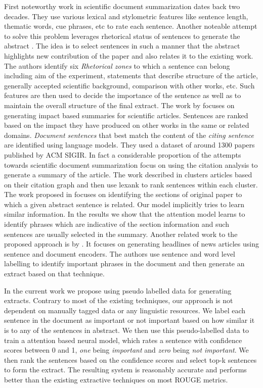 First noteworthy work in scientific document summarization dates back two decades\cite{kupiec1995trainable}. They use various lexical and stylometric features like sentence length, thematic words, cue phrases, etc to rate each sentence. Another noteable attempt to solve this problem leverages rhetorical status of sentences to generate the abstract \cite{teufel2002summarizing}. The idea is to select sentences in such a manner that the abstract highlights new contribution of the paper and also relates it to the existing work. The authors identify	six \emph{Rhetorical zones} to which a sentence can belong including aim of the experiment, statements that describe structure of the article, generally accepted scientific background, comparison with other works, etc. Such features are then used to decide the importance of the sentence as well as to maintain the overall structure of the final extract. The work by \cite{mei2008generating} focuses on generating impact based summaries for scientific articles. Sentences are ranked based on the impact they have produced on other works in the same or related domains. \emph{Document sentences} that best match the content of the \emph{citing sentence} are identified using language models. They used a dataset of around 1300 papers published by ACM SIGIR. In fact a considerable proportion of the attempts towards scientific document summarization focus on using the citation analysis to generate a summary of the article. The work described in \cite{abu2011coherent} clusters articles based on their citation graph and then use lexank to rank sentences within each cluster. The work proposed in \cite{hirohata2008identifying} focuses on identifying the sections of original paper to which a given abstract sentence is related. Our model implicitly tries to learn similar information. In the results we show that the attention model learns to identify phrases which are indicative of the section information and such sentences are usually selected in the summary. Another related work to the proposed approach is by \cite{cheng2016neural}. It focuses on generating headlines of news articles using sentence and document encoders. The authors use sentence and word level labelling to identify important phrases in the document and then generate an extract based on that technique. 

In the current work we propose using pseudo labelled data for generating extracts. Contrary to most of the existing techniques, our approach is not dependent on manually tagged data or any linguistic resources. We label each sentence in the document as important or not important based on how similar it is to any of the sentences in abstract. We then use this pseudo-labelled data to train a attention based neural model, which rates a sentence with confidence scores between 0 and 1, \emph{one} being \emph{important} and \emph{zero} being \emph{not important}. We then rank the sentences based on the confidence scores and select top-k sentences to form the extract. The resulting system is reasonably accurate and performs better than the existing extractive techniques on most ROUGE metrics.


